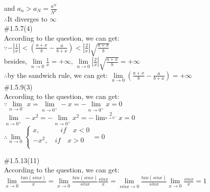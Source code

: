 \documentclass{article}
\begin{document}
and $a_n>a_N=\displaystyle\frac{a^N}{N^2}$\\

$\therefore$\qquad It diverges to $\infty$\\

\textcolor[rgb]{0.00,0.00,0.50}{\#1.5.7(4)}\\

According to the question, we can get:\\

$\because$\qquad$\displaystyle -\left|\frac{1}{x}\right|<\left(\frac{a+x}{b}-\frac{a}{b+x}\right)<\left|\frac{2}{x}\right|\sqrt{\frac{a+x}{b}}$\\

besides, $\lim \limits_{n \to 0}\displaystyle\frac{1}{x}=+\infty$, $\lim \limits_{n \to 0}\left|\frac{2}{x}\right|\sqrt{\frac{a+x}{b}}=+\infty$\\

$\therefore$\qquad by the sandwich rule, we can get: $\lim \limits_{n \to 0}\displaystyle\left(\frac{a+x}{b}-\frac{a}{b+x}\right)=+\infty$\\

\textcolor[rgb]{0.00,0.00,0.50}{\#1.5.9(3)}\\

According to the question, we can get:\\

$\because$\qquad$\lim \limits_{n \to 0^-}x=\lim \limits_{n \to 0^+}-x=-\lim \limits_{n \to 0^+}x=0$\\

\qquad\quad$\lim \limits_{n \to 0^+}-x^2=-\lim \limits_{n \to 0^+}x^2=-\lim^2 \limits_{n \to 0^+}x=0$\\

$\therefore$\qquad$\lim \limits_{n \to 0}
\left\{
\begin{aligned}
x,\qquad\quad if\quad x<0 \\
-x^2,\quad if\quad x>0 \\
\end{aligned}
\right.=0$\\

\vspace{3.5mm}

\textcolor[rgb]{0.00,0.00,0.50}{\#1.5.13(11)}\\

According to the question, we can get:\\

$\lim \limits_{x \to 0}\displaystyle\frac{tan(sinx)}{x}=\lim \limits_{x \to 0}\frac{tan(sinx)}{sinx}\frac{sinx}{x}=\lim \limits_{sinx \to 0}\frac{tan(sinx)}{sinx}\lim \limits_{x \to 0}\frac{sinx}{x}=1$\\
\end{document}
